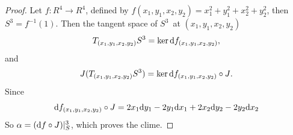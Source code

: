 \begin{proof}
Let $f:R^4 \to R^4$, defined by $f(x_1,y_1,x_2,y_2) = x_1^2+y_1^2+x_2^2+y_2^2$,
then $S^3 = f^{-1}(1)$. Then the tangent space of $S^3$ at $(x_1,y_1,x_2,y_2)$
\[ T_{(x_1,y_1,x_2,y_2)}S^3 = \operatorname{ker}{ \mathrm{d} f_{(x_1,y_1,x_2,y_2)} },   \]
and 
\[ J (T_{(x_1,y_1,x_2,y_2)}S^3) = \operatorname{ker}{ \mathrm{d} f_{(x_1,y_1,x_2,y_2)} \circ J}. \]
Since 
\[ \mathrm{d} f_{(x_1,y_1,x_2,y_2)} \circ J = 2 x_1 \mathrm{d} y_1 - 2 y_1 \mathrm{d} x_1 + 2 x_2 \mathrm{d} y_2 - 2 y_2 \mathrm{d} x_2 \]
So $\alpha = (\mathrm{d} f \circ J)|_S^3$, which proves the clime.
\end{proof}



